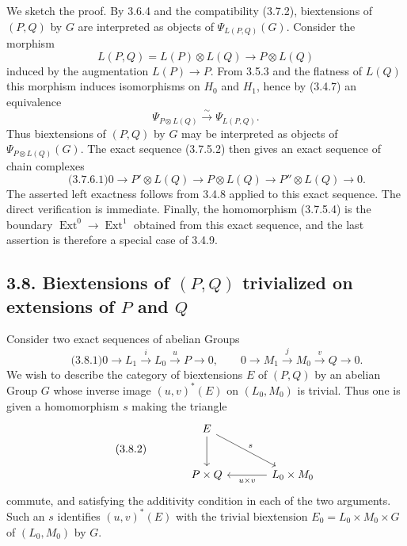\documentclass[11pt]{article}
\providecommand{\Ext}{\operatorname{Ext}}
\begin{document}
We sketch the proof.  By 3.6.4 and the compatibility (3.7.2), biextensions of \((P,Q)\) by \(G\) are interpreted as objects of \(\Psi_{L(P,Q)}(G)\).  Consider the morphism
\[
        L(P,Q)=L(P)\otimes L(Q)\longrightarrow P\otimes L(Q)
\]
induced by the augmentation \(L(P)\to P\).  From 3.5.3 and the flatness of \(L(Q)\) this morphism induces isomorphisms on \(H_0\) and \(H_1\), hence by (3.4.7) an equivalence
\[
        \Psi_{P\otimes L(Q)}\xrightarrow{\sim}\Psi_{L(P,Q)}.
\]
Thus biextensions of \((P,Q)\) by \(G\) may be interpreted as objects of \(\Psi_{P\otimes L(Q)}(G)\).  The exact sequence (3.7.5.2) then gives an exact sequence of chain complexes
\begin{equation}\qquad\text{(3.7.6.1)}
        0\longrightarrow P'\otimes L(Q)
        \longrightarrow P\otimes L(Q)
        \longrightarrow P''\otimes L(Q)
        \longrightarrow 0.
\end{equation}
The asserted left exactness follows from 3.4.8 applied to this exact sequence.  The direct verification is immediate.  Finally, the homomorphism (3.7.5.4) is the boundary \(\Ext^0\to\Ext^1\) obtained from this exact sequence, and the last assertion is therefore a special case of 3.4.9.

\subsection*{3.8. Biextensions of \((P,Q)\) trivialized on extensions of \(P\) and \(Q\)}

Consider two exact sequences of abelian Groups
\begin{equation}\qquad\text{(3.8.1)}
        0\longrightarrow L_1\xrightarrow{i}L_0\xrightarrow{u}P\longrightarrow 0,
        \qquad
        0\longrightarrow M_1\xrightarrow{j}M_0\xrightarrow{v}Q\longrightarrow 0.
\end{equation}
We wish to describe the category of biextensions \(E\) of \((P,Q)\) by an abelian Group \(G\) whose inverse image \((u,v)^*(E)\) on \((L_0,M_0)\) is trivial.  Thus one is given a homomorphism \(s\) making the triangle
\begin{equation}\qquad\text{(3.8.2)}
\begin{tikzcd}[column sep=large,row sep=large]
& E \arrow[d] \arrow[dr,"s"]&\\
& P\times Q & L_0\times M_0 \arrow[l,"u\times v"]
\end{tikzcd}
\end{equation}
commute, and satisfying the additivity condition in each of the two arguments.  Such an \(s\) identifies \((u,v)^*(E)\) with the trivial biextension \(E_0=L_0\times M_0\times G\) of \((L_0,M_0)\) by \(G\).
\end{document}
